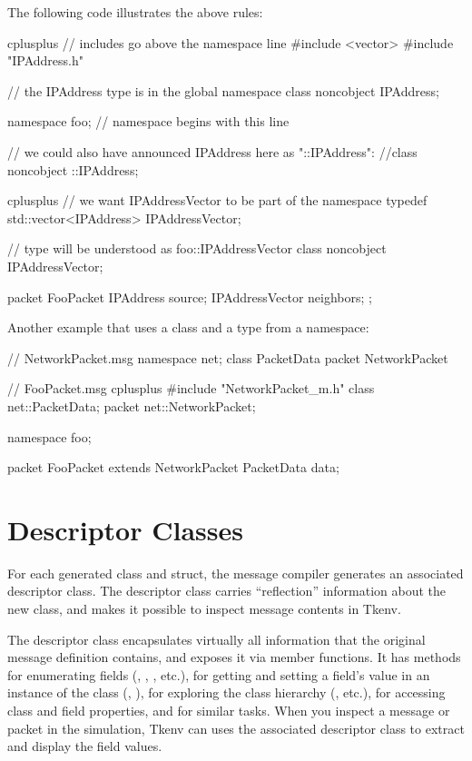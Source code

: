 The following code illustrates the above rules:

\begin{msg}
cplusplus {{
// includes go above the namespace line
#include <vector>
#include "IPAddress.h"
}}

// the IPAddress type is in the global namespace
class noncobject IPAddress;

namespace foo;  // namespace begins with this line

// we could also have announced IPAddress here as "::IPAddress":
//class noncobject ::IPAddress;

cplusplus {{
// we want IPAddressVector to be part of the namespace
typedef std::vector<IPAddress> IPAddressVector;
}}

// type will be understood as foo::IPAddressVector
class noncobject IPAddressVector;

packet FooPacket {
    IPAddress source;
    IPAddressVector neighbors;
};
\end{msg}

Another example that uses a  class and a  type
from a  namespace:

\begin{msg}
// NetworkPacket.msg
namespace net;
class PacketData { }
packet NetworkPacket { }
\end{msg}

\begin{msg}
// FooPacket.msg
cplusplus {{
#include "NetworkPacket_m.h"
}}
class net::PacketData;
packet net::NetworkPacket;

namespace foo;

packet FooPacket extends NetworkPacket
{
    PacketData data;
}
\end{msg}



\section{Descriptor Classes}
\label{sec:ch-msg-defs:descriptor-classes}

For each generated class and struct, the message compiler generates an
associated descriptor class. The descriptor class carries ``reflection''
information about the new class, and makes it possible to inspect message
contents in Tkenv.

The descriptor class encapsulates virtually all information that the
original message definition contains, and exposes it via member functions.
It has methods for enumerating fields (,
, , etc.), for getting
and setting a field's value in an instance of the class
(, ), for exploring the
class hierarchy (, etc.), for accessing
class and field properties, and for similar tasks. When you inspect a
message or packet in the simulation, Tkenv can uses the associated
descriptor class to extract and display the field values.

